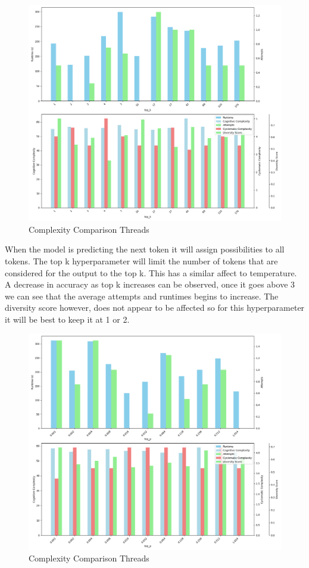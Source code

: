 \documentclass[12pt]{extarticle}
\begin{document}
\begin{figure}[H]
\centering
\includegraphics[width=0.7\linewidth]{Images/Hyperparam_top_k_Comparison.png}
\caption{Complexity Comparison Threads}
\label{fig:Complexity_Comparison_Threads}
\end{figure}

When the model is predicting the next token it will assign possibilities to all tokens. The top k hyperparameter will limit the number of tokens that are considered for the output to the top k. This has a similar affect to temperature. A decrease in accuracy as top k increases can be observed, once it goes above 3 we can see that the average attempts and runtimes begins to increase. The diversity score however, does not appear to be affected so for this hyperparameter it will be best to keep it at 1 or 2.

\begin{figure}[H]
\centering
\includegraphics[width=0.7\linewidth]{Images/Hyperparam_top_p_Comparison.png}
\caption{Complexity Comparison Threads}
\label{fig:Complexity_Comparison_Threads}
\end{figure}
\end{document}
